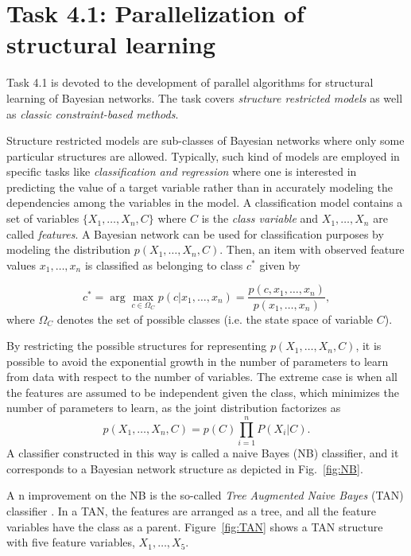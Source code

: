 

\section{Task 4.1: Parallelization of structural learning}\label{sec:parallel}

Task 4.1 is devoted to the development of parallel algorithms for structural learning of Bayesian networks.
The task covers \emph{structure restricted models} as well as \emph{classic constraint-based methods}.

Structure restricted models are sub-classes of Bayesian networks where only some particular structures
are allowed. Typically, such kind of models are employed in specific tasks like \emph{classification and regression}
where one is interested in predicting the value of a target variable rather than in accurately modeling the dependencies
among the variables in the model. A classification model contains a set of variables $\{X_1,\ldots,X_n,C\}$
where $C$ is the \emph{class variable} and $X_1,\ldots,X_n$ are called \emph{features}. A Bayesian network can be used
for classification purposes by modeling the distribution $p(X_1,\ldots,X_n,C)$. Then, an item with observed
feature values $x_1,\ldots,x_n$ is classified as belonging to class $c^*$ given by

\begin{equation}
\label{eq:class}
c^* = \arg\max_{c\in\Omega_C} p(c|x_1,\ldots,x_n) = \frac{p(c,x_1,\ldots,x_n)}{p(x_1,\ldots,x_n)} ,
\end{equation}
where $\Omega_C$ denotes the set of possible classes (i.e. the state space of variable $C$).

By restricting the possible structures for representing $p(X_1,\ldots,X_n,C)$, it is possible to avoid the exponential
growth in the number of parameters to learn from data with respect to the number of variables. The extreme case
is when all the features are assumed to be independent given the class, which minimizes the number of parameters
to learn, as the joint distribution factorizes as 
\[
p(X_1,\ldots,X_n,C) = p(C) \prod_{i=1}^nP(X_i|C) .
\]
A classifier constructed in this way is called a naive Bayes (NB) classifier, and it corresponds to a Bayesian network
structure as depicted in Fig.~\ref{fig:NB}.

A n improvement on the NB is the so-called \emph{Tree Augmented Naive Bayes} (TAN) classifier \cite{Fri97}. In a TAN, the
features are arranged as a tree, and all the feature variables have the class as a parent. Figure~\ref{fig:TAN}
shows a TAN structure with five feature variables, $X_1,\ldots,X_5$.

